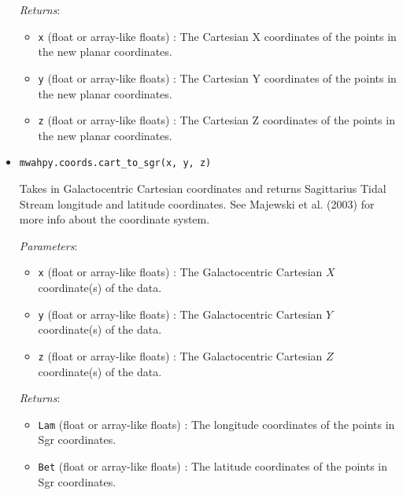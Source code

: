 \documentclass{article}
\begin{document}
\begin{itemize}
\begin{itemize}
\end{itemize}

\textit{Returns}: \begin{itemize}

\item \verb!x! (float or array-like floats) : The Cartesian X coordinates of the points in the new planar coordinates.

\item \verb!y! (float or array-like floats) : The Cartesian Y coordinates of the points in the new planar coordinates.

\item \verb!z! (float or array-like floats) : The Cartesian Z coordinates of the points in the new planar coordinates.

\end{itemize}



\item \verb!mwahpy.coords.cart_to_sgr(x, y, z)!

Takes in Galactocentric Cartesian coordinates and returns Sagittarius Tidal Stream longitude and latitude coordinates. See Majewski et al. (2003) for more info about the coordinate system. 

\textit{Parameters}: \begin{itemize}

\item \verb!x! (float or array-like floats) : The Galactocentric Cartesian $X$ coordinate(s) of the data.

\item \verb!y! (float or array-like floats) : The Galactocentric Cartesian $Y$ coordinate(s) of the data.

\item \verb!z! (float or array-like floats) : The Galactocentric Cartesian $Z$ coordinate(s) of the data.

\end{itemize}

\textit{Returns}: \begin{itemize}

\item \verb!Lam! (float or array-like floats) : The longitude coordinates of the points in Sgr coordinates.

\item \verb!Bet! (float or array-like floats) : The latitude coordinates of the points in Sgr coordinates.

\end{itemize}




\end{itemize}
\end{document}

